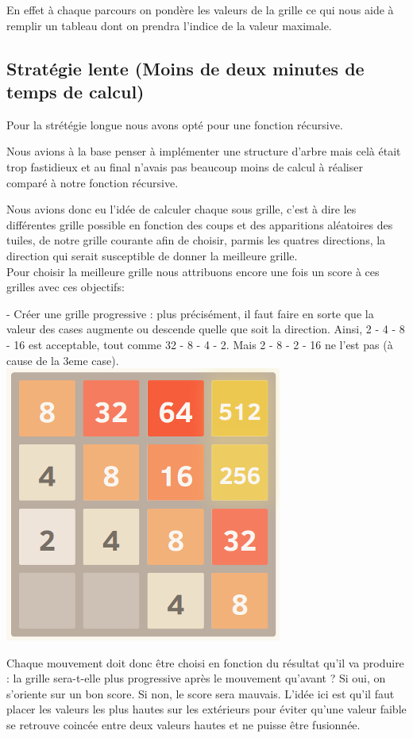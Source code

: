 \documentclass{article}
\begin{document}
  En effet à chaque parcours on pondère les valeurs de la grille ce qui nous aide à remplir un tableau dont on prendra l'indice de la valeur maximale.
  \subsection{Stratégie lente (Moins de deux minutes de temps de calcul)}

  Pour la strétégie longue nous avons opté pour une fonction récursive.

  Nous avions à la base penser à implémenter une structure d'arbre mais celà était trop fastidieux et au final n'avais pas beaucoup moins de calcul à réaliser comparé à notre fonction récursive.

  Nous avions donc eu l'idée de calculer chaque sous grille, c'est à dire les différentes grille possible en fonction des coups et des apparitions aléatoires des tuiles, de notre grille courante afin de choisir, parmis les quatres directions, la direction qui serait susceptible de donner la meilleure grille.
\\
  Pour choisir la meilleure grille nous attribuons encore une fois un score à ces grilles avec ces objectifs:
  \newline
  
  - Créer une grille progressive : plus précisément, il faut faire en sorte que la valeur des cases augmente ou descende quelle que soit la direction. Ainsi, 2 - 4 - 8 - 16 est acceptable, tout comme 32 - 8 - 4 - 2. Mais 2 - 8 - 2 - 16 ne l'est pas (à cause de la 3eme case).
  \\
  \includegraphics[scale=0.5]{../1.png}

Chaque mouvement doit donc être choisi en fonction du résultat qu'il va produire : la grille sera-t-elle plus progressive après le mouvement qu'avant ? Si oui, on s'oriente sur un bon score. Si non, le score sera mauvais. L'idée ici est qu'il faut placer les valeurs les plus hautes sur les extérieurs pour éviter qu'une valeur faible se retrouve coincée entre deux valeurs hautes et ne puisse être fusionnée.
\end{document}
